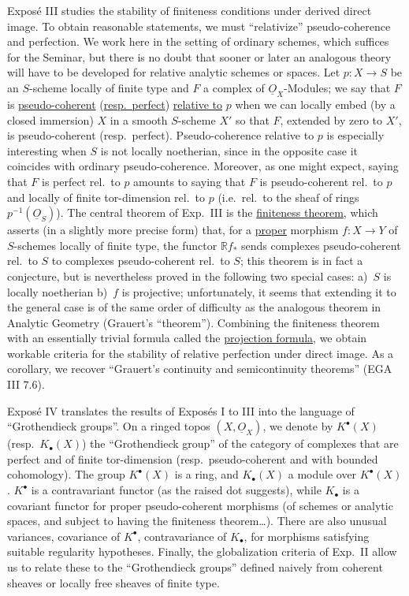 Exposé III studies the stability of finiteness conditions under derived direct image. To obtain reasonable statements, we must ``relativize'' pseudo-coherence and perfection. We work here in the setting of ordinary schemes, which suffices for the Seminar, but there is no doubt that sooner or later an analogous theory will have to be developed for relative analytic schemes or spaces. Let \(p:X\to S\) be an \(S\)-scheme locally of finite type and \(F\) a complex of \(\underline{O}_X\)-Modules; we say that \(F\) is \uline{pseudo-coherent} (\uline{resp.\ perfect}) \uline{relative to} \(p\) when we can locally embed (by a closed immersion) \(X\) in a smooth \(S\)-scheme \(X'\) so that \(F\), extended by zero to \(X'\), is pseudo-coherent (resp.\ perfect). Pseudo-coherence relative to \(p\) is especially interesting when \(S\) is not locally noetherian, since in the opposite case it coincides with ordinary pseudo-coherence. Moreover, as one might expect, saying that \(F\) is perfect rel.\ to \(p\)
%
amounts to saying that \(F\) is pseudo-coherent rel.\ to \(p\) and locally of finite tor-dimension rel.\ to \(p\) (i.e.\ rel.\ to the sheaf of rings \(p^{-1}(\underline{O}_S)\)). The central theorem of Exp.\ III is the \uline{finiteness theorem}, which asserts (in a slightly more precise form) that, for a \uline{proper} morphism \(f:X\to Y\) of \(S\)-schemes locally of finite type, the functor \(\mathbb{R}f_*\) sends complexes pseudo-coherent rel.\ to \(S\) to complexes pseudo-coherent rel.\ to \(S\); this theorem is in fact a conjecture, but is nevertheless proved in the following two special cases: a)~\(S\) is locally noetherian b)~\(f\) is projective; unfortunately, it seems that extending it to the general case is of the same order of difficulty as the analogous theorem in Analytic Geometry (Grauert's ``theorem''). Combining the finiteness theorem with an essentially trivial formula called the \uline{projection formula}, we obtain workable criteria for the stability of relative perfection under direct image. As a corollary, we recover ``Grauert's continuity and semicontinuity theorems'' (EGA III 7.6).

Exposé IV translates the results of Exposés I to III into the language of ``Grothendieck groups''. On a ringed topos \((X,\underline{O}_X)\), we denote by \(K^\bullet(X)\) (resp.\ \(K_\bullet(X)\)) the ``Grothendieck group'' of the category of complexes that are perfect and of finite tor-dimension (resp.\ pseudo-coherent and with bounded cohomology). The group \(K^\bullet(X)\) is a ring, and \(K_\bullet(X)\) a module over \(K^\bullet(X)\). \(K^\bullet\) is a contravariant functor (as the raised dot suggests), while \(K_\bullet\) is a covariant functor for proper pseudo-coherent morphisms (of schemes or analytic spaces, and subject to having the finiteness theorem\dots). There are also unusual variances,
%
covariance of \(K^\bullet\), contravariance of \(K_\bullet\), for morphisms satisfying suitable regularity hypotheses. Finally, the globalization criteria of Exp.\ II allow us to relate these to the ``Grothendieck groups'' defined naively from coherent sheaves or locally free sheaves of finite type.

